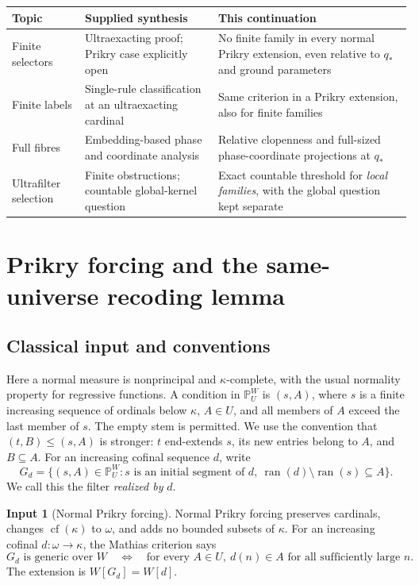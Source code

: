 \documentclass[11pt,letterpaper]{article}
\theoremstyle{definition}
\newtheorem{inputthm}{Input}
\numberwithin{equation}{section}
\newcommand{\cf}{\operatorname{cf}}
\newcommand{\ran}{\operatorname{ran}}
\newcommand{\PP}{\mathbb P}
\begin{document}
\begin{center}
\small
\renewcommand{\arraystretch}{1.15}
\begin{tabularx}{\textwidth}{@{}P{.26\textwidth}YY@{}}
\toprule
\textbf{Topic}&\textbf{Supplied synthesis}&\textbf{This continuation}\\\midrule
Finite selectors&Ultraexacting proof; Prikry case explicitly open&No finite
family in every normal Prikry extension, even relative to $q_*$ and ground parameters\\
Finite labels&Single-rule classification at an ultraexacting cardinal&Same
criterion in a Prikry extension, also for finite families\\
Full fibres&Embedding-based phase and coordinate analysis&Relative clopenness
and full-sized phase-coordinate projections at $q_*$\\
Ultrafilter selection&Finite obstructions; countable global-kernel question&Exact
countable threshold for \emph{local families}, with the global question kept separate\\
\bottomrule
\end{tabularx}
\end{center}

\section{Prikry forcing and the same-universe recoding lemma}\label{sec:recoding}

\subsection{Classical input and conventions}

Here a normal measure is nonprincipal and $\kappa$-complete, with the usual
normality property for regressive functions. A condition in $\PP_U^W$ is
$(s,A)$, where $s$ is a finite increasing sequence
of ordinals below $\kappa$, $A\in U$, and all members of $A$ exceed the last
member of $s$. The empty stem is permitted. We use the convention that
$(t,B)\le(s,A)$ is stronger: $t$ end-extends $s$, its new entries belong to $A$,
and $B\subseteq A$. For an increasing cofinal sequence $d$, write
\[
 G_d=\{(s,A)\in\PP_U^W:
            s\text{ is an initial segment of }d,
            \ \ran(d)\setminus\ran(s)\subseteq A\}.
\]
We call this the filter \emph{realized by} $d$.

\begin{inputthm}[Normal Prikry forcing]\label{in:prikry}
Normal Prikry forcing preserves cardinals, changes $\cf(\kappa)$ to $\omega$,
and adds no bounded subsets of $\kappa$. For an increasing cofinal
$d:\omega\to\kappa$, the Mathias criterion says
\[
 G_d\text{ is generic over }W
 \quad\Longleftrightarrow\quad
 \text{for every }A\in U,
       \ d(n)\in A\text{ for all sufficiently large }n.
\]
The extension is $W[G_d]=W[d]$.
\end{inputthm}
\end{document}
